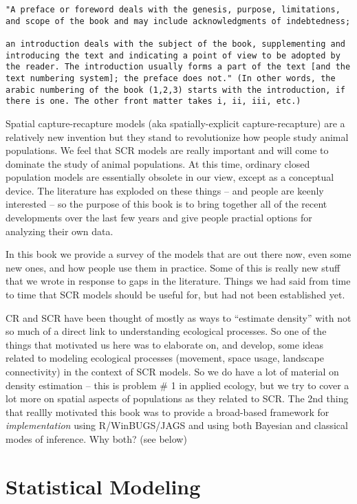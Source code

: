 \begin{verbatim}
"A preface or foreword deals with the genesis, purpose, limitations,
and scope of the book and may include acknowledgments of indebtedness;

an introduction deals with the subject of the book, supplementing and
introducing the text and indicating a point of view to be adopted by
the reader. The introduction usually forms a part of the text [and the
text numbering system]; the preface does not." (In other words, the
arabic numbering of the book (1,2,3) starts with the introduction, if
there is one. The other front matter takes i, ii, iii, etc.)
\end{verbatim}


Spatial capture-recapture models (aka spatially-explicit
capture-recapture) are a relatively new invention but they stand to
revolutionize how people study animal populations. We feel
that SCR models are really important and will come to dominate the
study of animal populations. At this time, ordinary closed population
models are essentially obsolete in our view, except as a conceptual
device. The literature has exploded on these things -- and people are
keenly interested -- so the purpose of this book is to bring together
all of the recent developments over the last few years and give people
practial options for analyzing their own data. 

In this book we
provide a survey of the models that are out there now, even some new
ones, and  how people use them in practice. Some of this is really new
stuff that we wrote in response to gaps in the literature. Things we
had  said from time to time that SCR models should be useful for,
but had not been established yet. 

CR and SCR have been thought of mostly as ways to ``estimate density''
with not so much of a direct link to understanding ecological
processes. So one of the things that motivated us here was to
elaborate on, and develop, some ideas related to modeling ecological
processes (movement, space usage, landscape connectivity) in the
context of SCR models. 
So we do have a lot of material on density estimation -- this is
problem \# 1 in applied ecology, but we try to cover a lot more on
spatial aspects of populations as they related to SCR.
The 2nd thing that reallly motivated this book was to provide a
broad-based framework for {\it implementation} using R/WinBUGS/JAGS and
using both Bayesian and classical modes of inference. 
Why both? (see below) 

\section*{Statistical Modeling}

